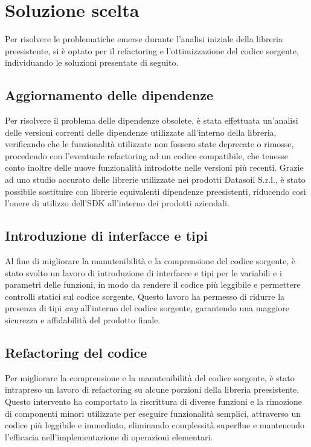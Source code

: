 \section{Soluzione scelta}
Per risolvere le problematiche emerse durante l'analisi iniziale della libreria preesistente, si è optato per il refactoring e l'ottimizzazione
del codice sorgente, individuando le soluzioni presentate di seguito.

\subsection{Aggiornamento delle dipendenze}
Per risolvere il problema delle dipendenze obsolete, è stata effettuata un'analisi delle versioni correnti delle dipendenze utilizzate all'interno della libreria,
verificando che le funzionalità utilizzate non fossero state deprecate o rimosse, procedendo con l'eventuale refactoring ad un codice compatibile, che tenesse conto 
inoltre delle nuove funzionalità introdotte nelle versioni più recenti. \newline
Grazie ad uno studio accurato delle librerie utilizzate nei prodotti Datasoil S.r.l., è stato possibile sostituire con librerie equivalenti dipendenze preesistenti, 
riducendo così l'onere di utilizzo dell'SDK all'interno dei prodotti aziendali. 

\subsection{Introduzione di interfacce e tipi}
Al fine di migliorare la manutenibilità e la comprensione del codice sorgente, è stato svolto un lavoro di introduzione di interfacce e tipi per le variabili e i parametri
delle funzioni, in modo da rendere il codice più leggibile e permettere controlli statici sul codice sorgente. \newline
Questo lavoro ha permesso di ridurre la presenza di tipi \textit{any} all'interno del codice sorgente, garantendo una maggiore sicurezza e affidabilità del prodotto finale.

\subsection{Refactoring del codice}
Per migliorare la comprensione e la manutenibilità del codice sorgente, è stato intrapreso un lavoro di refactoring su alcune porzioni della libreria preesistente. 
Questo intervento ha comportato la riscrittura di diverse funzioni e la rimozione di componenti minori utilizzate per eseguire funzionalità semplici, attraverso un codice
più leggibile e immediato, eliminando complessità superflue e mantenendo l'efficacia nell'implementazione di operazioni elementari.

